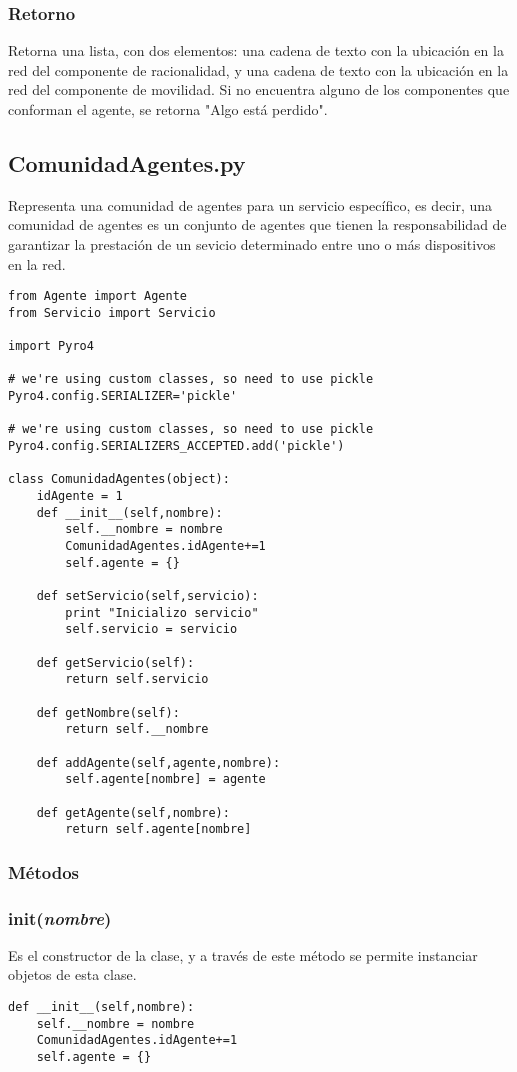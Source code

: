 \documentclass{article}
\begin{document}
\subsubsection*{Retorno}
Retorna una lista, con dos elementos: una cadena de texto con la ubicación en la red del componente de racionalidad, y una cadena de texto con la ubicación en la red del componente de movilidad. Si no encuentra alguno de los componentes que conforman el agente, se retorna "Algo está perdido".
\subsection{ComunidadAgentes.py}
Representa una comunidad de agentes para un servicio específico, es decir, una comunidad de agentes es un conjunto de agentes que tienen la responsabilidad de garantizar la prestación de un sevicio determinado entre uno o más dispositivos en la red.
\begin{lstlisting}
from Agente import Agente
from Servicio import Servicio

import Pyro4

# we're using custom classes, so need to use pickle
Pyro4.config.SERIALIZER='pickle'

# we're using custom classes, so need to use pickle
Pyro4.config.SERIALIZERS_ACCEPTED.add('pickle')

class ComunidadAgentes(object):
    idAgente = 1
    def __init__(self,nombre):
        self.__nombre = nombre
        ComunidadAgentes.idAgente+=1
        self.agente = {}
        
    def setServicio(self,servicio):
        print "Inicializo servicio"
        self.servicio = servicio
        
    def getServicio(self):
        return self.servicio
        
    def getNombre(self):
        return self.__nombre
        
    def addAgente(self,agente,nombre):
        self.agente[nombre] = agente
        
    def getAgente(self,nombre):
        return self.agente[nombre]
\end{lstlisting}
\subsubsection*{Métodos}
\subsubsection{\textbf{init}(\textit{nombre})}
Es el constructor de la clase, y a través de este método se permite instanciar objetos de esta clase.
\begin{lstlisting}
def __init__(self,nombre):
	self.__nombre = nombre
	ComunidadAgentes.idAgente+=1
	self.agente = {}
\end{lstlisting}
\end{document}
